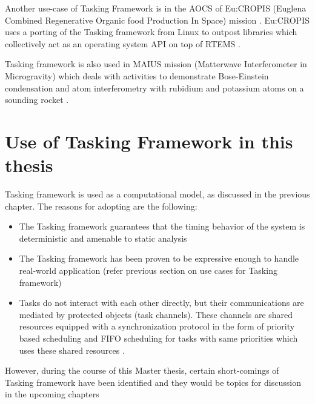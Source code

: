 Another use-case of Tasking Framework is in the AOCS of Eu:CROPIS (Euglena Combined Regenerative Organic food Production In Space) mission \cite{TETtoEUCROPIS}. Eu:CROPIS uses a porting of the Tasking framework from Linux to outpost libraries which collectively act as an operating system API on top of RTEMS \cite{TETtoEUCROPIS}.

Tasking framework is also used in MAIUS mission (Matterwave Interferometer in Microgravity) which deals with activities to demonstrate Bose-Einstein condensation and atom interferometry with rubidium and potassium atoms on a sounding rocket \cite{TETtoEUCROPIS,MAIUS}.

\section{Use of Tasking Framework in this thesis}
Tasking framework is used as a computational model, as discussed in the previous chapter. The reasons for adopting are the following:

\begin{itemize}
\item The Tasking framework guarantees that the timing behavior of the system is deterministic and amenable to static analysis
\item The Tasking framework has been proven to be expressive enough to handle real-world application (refer previous section on use cases for Tasking framework)
\item Tasks do not interact with each other directly, but their communications are mediated by protected objects (task channels). These channels are shared resources equipped with a synchronization protocol in the form of priority based scheduling and FIFO scheduling for tasks with same priorities which uses these shared resources \cite{TaskFr}.  
\end{itemize}  

However, during the course of this Master thesis, certain short-comings of Tasking framework have been identified and they would be topics for discussion in the upcoming chapters

             



          